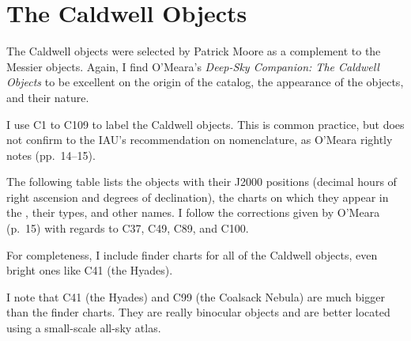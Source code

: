 
\chapter{The Caldwell Objects}

The Caldwell objects were selected by Patrick Moore as a complement to the Messier objects. Again, I find O’Meara’s \emph{Deep-Sky Companion: The Caldwell Objects} to be excellent on the origin of the catalog, the appearance of the objects, and their nature.

I use C1 to C109 to label the Caldwell objects. This is common practice, but does not confirm to the IAU’s recommendation on nomenclature, as O’Meara rightly notes (pp.\ 14--15).

The following table lists the objects with their J2000 positions (decimal hours of right ascension and degrees of declination), the charts on which they appear in the {\PSA}, their types, and other names. I follow the corrections given by O’Meara (p.\ 15) with regards to C37, C49, C89, and C100.

For completeness, I include finder charts for all of the Caldwell objects, even bright ones like C41 (the Hyades).

I note that C41 (the Hyades) and C99 (the Coalsack Nebula) are much bigger than the finder charts. They are really binocular objects and are better located using a small-scale all-sky atlas.


\clearpage

